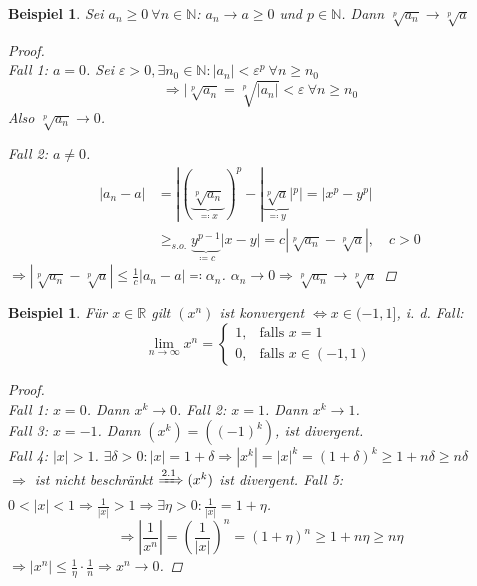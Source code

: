 \documentclass[14pt,titlepage,ngerman,a4paper,headsepline,DIV15,halfparskip*]{scrartcl}
\newcommand{\N}{\mathbb{N}}
\newcommand{\R}{\mathbb{R}}
\theoremstyle{named}
\theoremstyle{dotless}
\newtheorem{beispiel}[namedtheorem]{Beispiel}
\begin{document}
\begin{beispiel} \label{2.4:bsp}
	Sei $a_{n} \geq 0 ~\forall n \in \N$: $a_{n} \rightarrow a \geq 0$ und $p \in \N$. Dann $\sqrt[p]{a_{n}} \rightarrow \sqrt[p]{a}$
	
	\begin{proof} ~\\
		Fall 1: $a = 0$. Sei $\varepsilon > 0, \exists n_{0} \in \N: |a_{n}| < \varepsilon^{p} ~\forall n \geq n_{0}$
		$$
			\Rightarrow | \sqrt[p]{a_{n}} = \sqrt[p]{|a_{n}|} < \varepsilon ~\forall n \geq n_{0}
		$$
		Also $\sqrt[p]{a_{n}} \rightarrow 0$. \newline
		
		Fall 2: $a \neq 0$.
		\begin{align*}
			|a_{n} - a| & = | (\underbrace{\sqrt[p]{a_{n}}}_{\eqqcolon x})^{p} - |\underbrace{\sqrt[p]{a}}_{\eqqcolon y}|^{p} | =  |x^{p} - y^{p}| \\
					& \geq_{s.o.} \underbrace{y^{p-1}}_{\coloneqq c} |x - y| = c | \sqrt[p]{a_{n}} - \sqrt[p]{a} |, \quad c > 0
		\end{align*}
		$\Rightarrow |\sqrt[p]{a_{n}} - \sqrt[p]{a}| \leq \frac{1}{c} |a_{n} - a| \eqqcolon \alpha_{n}$. $\alpha_{n} \rightarrow 0 \Rightarrow \sqrt[p]{a_{n}} \rightarrow \sqrt[p]{a}$
	\end{proof} 
\end{beispiel}


\begin{beispiel} \label{2.5:bsp}
	Für $x \in \R$ gilt $(x^{n})$ ist konvergent $\iff x \in (-1,1]$, i. d. Fall:
	$$
		\lim_{n \rightarrow \infty} x^{n} = \begin{cases} 1, & \text{falls } x = 1 \\ 0, & \text{falls } x \in (-1 , 1) \end{cases}
	$$
	
	\begin{proof} ~\\
		Fall 1: $x = 0$. Dann $x^{k} \rightarrow 0$. Fall 2: $x = 1$. Dann $x^{k} \rightarrow 1$. \\
		Fall 3: $x = -1$. Dann $(x^{k}) = ((-1)^{k})$, ist divergent. \\
		Fall 4: $|x| > 1$. $\exists \delta > 0: |x| = 1 + \delta \Rightarrow |x^{k}| = |x|^{k} = (1 + \delta)^{k} \geq 1 + n \delta \geq n \delta$ \\
		 $\Rightarrow$ ist nicht beschränkt $\xRightarrow[]{2.1} (x^{k})$ ist divergent.
		Fall 5: $0 < |x| < 1 \Rightarrow \frac{1}{|x|} > 1 \Rightarrow \exists \eta > 0: \frac{1}{|x|} = 1 + \eta$.
		$$
			\Rightarrow |\frac{1}{x^{n}}| = \left( \frac{1}{|x|} \right)^{n} = (1 + \eta)^{n} \geq 1 + n \eta \geq n \eta
		$$
		$\Rightarrow |x^{n}| \leq \frac{1}{\eta} \cdot \frac{1}{n} \Rightarrow x^{n} \rightarrow 0$.
	\end{proof}	
\end{beispiel}
\end{document}
